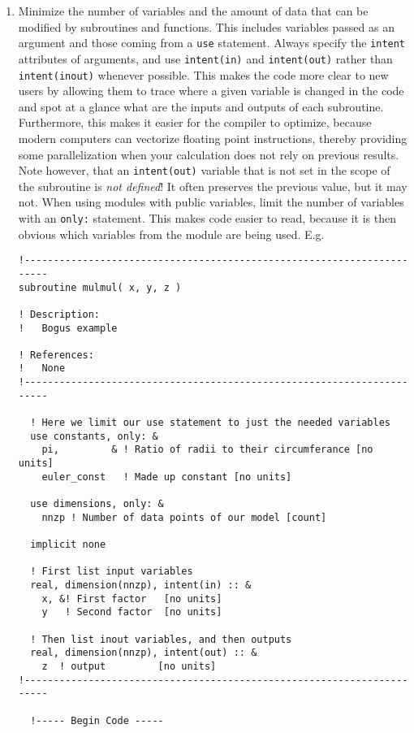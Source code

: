 \documentclass[letterpaper,12pt]{article}
\begin{document}
\begin{enumerate}
\item Minimize the number of variables and the amount of data that can be 
modified by subroutines and functions.  This includes variables passed as an 
argument and those coming from a \texttt{use} statement. 
Always specify the \texttt{intent} attributes of arguments, and 
use \texttt{intent(in)} 
and \texttt{intent(out)} rather than \texttt{intent(inout)} whenever possible.
This makes the code more clear to new users by allowing them to trace where a 
given variable is changed in the code and spot at a glance what are the inputs and
outputs of each subroutine.  Furthermore,
this makes it easier for the compiler to optimize, because modern computers can 
vectorize floating point instructions, thereby providing some 
parallelization when your calculation does not rely on previous results.
Note however, that an \texttt{intent(out)} variable that is not set in the scope of the subroutine
is \emph{not defined}!  It often preserves the previous value, but it may not.
When using modules with public variables, limit 
the number of variables with an \texttt{only:} statement.  This makes code 
easier to read, because it is then obvious which variables from the module are being 
used.\newline
E.g.
\begin{verbatim}
!-----------------------------------------------------------------------
subroutine mulmul( x, y, z )

! Description:
!   Bogus example

! References:
!   None
!-----------------------------------------------------------------------

  ! Here we limit our use statement to just the needed variables
  use constants, only: &
    pi,         & ! Ratio of radii to their circumferance [no units]
    euler_const   ! Made up constant [no units]

  use dimensions, only: &
    nnzp ! Number of data points of our model [count]

  implicit none

  ! First list input variables
  real, dimension(nnzp), intent(in) :: &
    x, &! First factor   [no units]
    y   ! Second factor  [no units]

  ! Then list inout variables, and then outputs 
  real, dimension(nnzp), intent(out) :: &
    z  ! output         [no units]
!-----------------------------------------------------------------------

  !----- Begin Code -----


\end{verbatim}
\end{enumerate}
\end{document}
